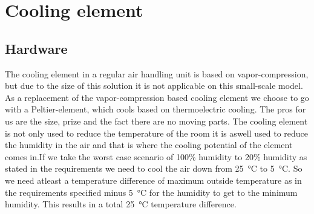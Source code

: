\documentclass[a4paper,oneside]{book}
\begin{document}
\section{Cooling element}
\label{sec:cooling}

\subsection{Hardware}
The cooling element in a regular air handling unit is based on
vapor-compression, but due to the size of this solution it is not applicable on
this small-scale model. As a replacement of the vapor-compression based cooling
element we choose to go with a Peltier-element, which cools based on
thermoelectric cooling. The pros for us are the size, prize and the fact there
are no moving parts. The cooling element is not only used to reduce the
temperature of the room it is aswell used to reduce the humidity in the air and
that is where the cooling potential of the element comes in.If we take the
worst case scenario of 100\% humidity to 20\% humidity as stated in the
requirements we need to cool the air down from \SI{25}{\celsius} to
\SI{5}{\celsius}. So we need atleast a temperature difference of maximum
outside temperature as in the requirements specified minus \SI{5}{\celsius} for
the humidity to get to the minimum humidity. This results in a total
\SI{25}{\celsius} temperature difference.

\begin{table}[!htb]
\centering
{}
\caption{Comparison of Peltier elements}
\label{tab:peltier}
\end{table}
\end{document}
